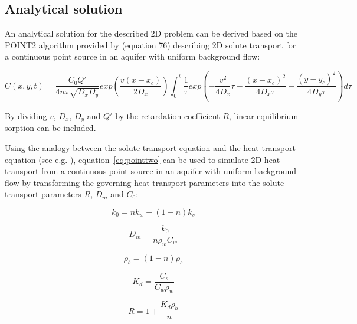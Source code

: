 

\subsection{Analytical solution}

An analytical solution for the described 2D problem can be derived based on the POINT2 algorithm provided by \cite{wexler1992} (equation 76) describing 2D solute transport for a continuous point source in an aquifer with uniform background flow:

\begin{equation}
    C(x,y,t) = \frac{C_0Q'}{4n\pi\sqrt{D_xD_y}}exp(\frac{v(x-x_c)}{2D_x})\int_0^t\frac{1}{\tau} exp(-\frac{v^2}{4D_x}\tau - \frac{(x-x_c)^2}{4D_x\tau}-\frac{(y-y_c)^2}{4D_y\tau})d\tau
    \label{eq:pointtwo}
\end{equation}

By dividing $v$, $D_x$, $D_y$ and $Q'$ by the retardation coefficient $R$, linear equilibrium sorption can be included.

Using the analogy between the solute transport equation and the heat transport equation (see e.g. \cite{zheng2010mt3dmsv5.3}), equation~\ref{eq:pointtwo} can be used to simulate 2D heat transport from a continuous point source in an aquifer with uniform background flow by transforming the governing heat transport parameters into the solute transport parameters $R$, $D_m$ and $C_0$:

\begin{equation}
    k_0 = n k_w + (1 - n) k_s 
    \label{eq:bhe-k0}
\end{equation}

\begin{equation}
    D_m = \frac{k_0}{n  \rho_w  C_w}  
    \label{eq:bhe-Dm}
\end{equation}

\begin{equation}
    \rho_b = (1 - n) \rho_s  
    \label{eq:bhe-rhob}
\end{equation}

\begin{equation}
    K_d = \frac{C_s}{C_w \rho_w}  
    \label{eq:bhe-KD}
\end{equation}

\begin{equation}
    R = 1 + \frac{K_d \rho_b}{n}  
    \label{eq:bhe-R}
\end{equation}


